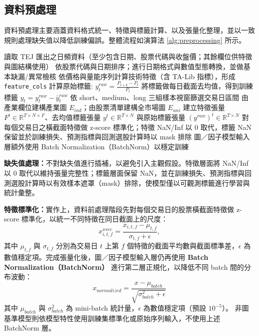 \FloatBarrier



\subsection{資料預處理}
\label{subsec:preprocess}
\FloatBarrier

資料預處理主要涵蓋資料格式統一、特徵與標籤計算、以及張量化整理，並以一致規則處理缺失值以降低訓練偏誤。整體流程如演算法 \ref{alg:preprocessing} 所示。

\begin{algorithm}[H]
\caption{資料預處理流程}
\label{alg:preprocessing}
\begin{algorithmic}[1]
\State 讀取 TEJ 匯出之日頻資料（至少包含日期、股票代碼與收盤價；其餘欄位供特徵與圖結構使用）
\State 依股票代碼與日期排序；進行日期格式與數值型態轉換，並做基本缺漏/異常檢核
\State 依價格與量能序列計算技術特徵（含 TA-Lib 指標），形成 \texttt{feature\_cols}
\State 計算原始標籤: $y^{raw}_t = \frac{P_{t+k} - P_t}{P_t}$ 
\State 將標籤做每日截面去均值，得到訓練標籤 $y_t = y^{raw}_t - \bar{y}^{raw}_t$
\State 依 short、medium、long 三組樣本視窗篩選交易日區間
\State 由產業欄位建構產業圖 $E_{ind}$；由股票清單建構全市場圖 $E_{uni}$
\State 建立特徵張量 $F^t \in \mathbb{R}^{T \times N \times F}$、去均值標籤張量 $y^t \in \mathbb{R}^{T \times N}$ 與原始標籤張量 $(y^{raw})^t \in \mathbb{R}^{T \times N}$
\State 對每個交易日之橫截面特徵做 z-score 標準化；特徵 NaN/Inf 以 0 取代，標籤 NaN 保留並於訓練損失、預測指標與回測選股計算時以 mask 排除
\State 圖／因子模型輸入層額外使用 Batch Normalization（BatchNorm）以穩定訓練
\end{algorithmic}
\end{algorithm}

\FloatBarrier

\textbf{缺失值處理：}不對缺失值進行插補，以避免引入主觀假設。特徵層面將 NaN/Inf 以 0 取代以維持張量完整性；標籤層面保留 NaN，並在訓練損失、預測指標與回測選股計算時以有效樣本遮罩（mask）排除，使模型僅以可觀測標籤進行學習與統計彙整。

\textbf{特徵標準化：}實作上，資料前處理階段先對每個交易日的股票橫截面特徵做 z-score 標準化，以統一不同特徵在同日截面上的尺度：
\begin{equation}
x^{xsec}_{i,t,f} = \frac{x_{i,t,f} - \mu_{t,f}}{\sigma_{t,f} + \epsilon},
\label{eq:xsec_zscore}
\end{equation}
其中 \(\mu_{t,f}\) 與 \(\sigma_{t,f}\) 分別為交易日 \(t\) 上第 \(f\) 個特徵的截面平均數與截面標準差，\(\epsilon\) 為數值穩定項。完成張量化後，圖／因子模型輸入層仍再使用 \textbf{Batch Normalization（BatchNorm）} 進行第二層正規化，以降低不同 batch 間的分布波動：
\begin{equation}
x_{normalized} = \frac{x - \mu_{batch}}{\sqrt{\sigma^2_{batch} + \epsilon}}
\label{eq:batchnorm}
\end{equation}
其中 $\mu_{batch}$ 與 $\sigma^2_{batch}$ 為 mini-batch 統計量，$\epsilon$ 為數值穩定項（預設 $10^{-5}$）。
非圖基準模型則依模型特性使用訓練集標準化或原始序列輸入，不使用上述 BatchNorm 層。

